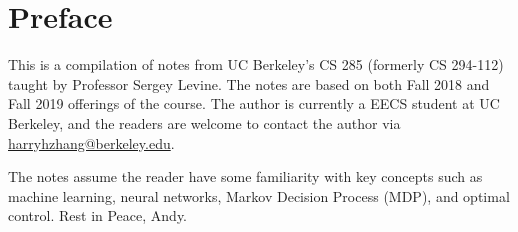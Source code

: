 \chapter*{Preface}
This is a compilation of notes from UC Berkeley's CS 285 (formerly CS 294-112) taught by Professor Sergey Levine. The notes are based on both Fall 2018 and Fall 2019 offerings of the course. The author is currently a EECS student at UC Berkeley, and the readers are welcome to contact the author via \href{mailto:harryhzhang@berkeley.edu}{harryhzhang@berkeley.edu}.

The notes assume the reader have some familiarity with key concepts such as machine learning, neural networks, Markov Decision Process (MDP), and optimal control.
\newline
\linebreak
Rest in Peace, Andy.